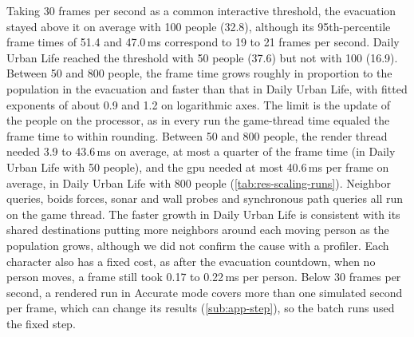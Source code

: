 Taking 30 frames per second as a common interactive threshold, the evacuation stayed above it on average with 100 people (32.8), although its 95th-percentile frame times of 51.4 and 47.0\,ms correspond to 19 to 21 frames per second. Daily Urban Life reached the threshold with 50 people (37.6) but not with 100 (16.9). Between 50 and 800 people, the frame time grows roughly in proportion to the population in the evacuation and faster than that in Daily Urban Life, with fitted exponents of about 0.9 and 1.2 on logarithmic axes. The limit is the update of the people on the processor, as in every run the game-thread time equaled the frame time to within rounding. Between 50 and 800 people, the render thread needed 3.9 to 43.6\,ms on average, at most a quarter of the frame time (in Daily Urban Life with 50 people), and the \gls{gpu} needed at most 40.6\,ms per frame on average, in Daily Urban Life with 800 people (\cref{tab:res-scaling-runs}). Neighbor queries, boids forces, sonar and wall probes and synchronous path queries all run on the game thread. The faster growth in Daily Urban Life is consistent with its shared destinations putting more neighbors around each moving person as the population grows, although we did not confirm the cause with a profiler. Each character also has a fixed cost, as after the evacuation countdown, when no person moves, a frame still took 0.17 to 0.22\,ms per person. Below 30 frames per second, a rendered run in Accurate mode covers more than one simulated second per frame, which can change its results (\cref{sub:app-step}), so the batch runs used the fixed step.

